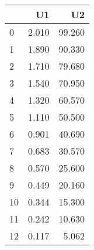 \begin{tabular}{lrr}
\toprule
{} &     U1 &      U2 \\
\midrule
0  &  2.010 &  99.260 \\
1  &  1.890 &  90.330 \\
2  &  1.710 &  79.680 \\
3  &  1.540 &  70.950 \\
4  &  1.320 &  60.570 \\
5  &  1.110 &  50.500 \\
6  &  0.901 &  40.690 \\
7  &  0.683 &  30.570 \\
8  &  0.570 &  25.600 \\
9  &  0.449 &  20.160 \\
10 &  0.344 &  15.300 \\
11 &  0.242 &  10.630 \\
12 &  0.117 &   5.062 \\
\bottomrule
\end{tabular}
